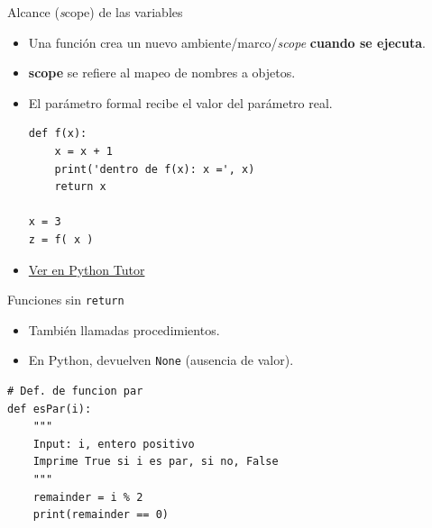 \documentclass[mathserif]{beamer}
\begin{document}
\begin{frame}[fragile]{Alcance (\textit scope) de las variables}
    \begin{itemize}
        \item Una función crea un nuevo ambiente/marco/\textit{scope} {\blue\bfseries cuando se ejecuta}.
        
        \item {\blue\bfseries scope} se refiere al mapeo de nombres a objetos.
        
        \item El {\orange parámetro formal} recibe el valor del {\orange parámetro real}.  
    
\begin{lstlisting}
def f(x):
    x = x + 1
    print('dentro de f(x): x =', x)
    return x

x = 3
z = f( x )
\end{lstlisting}
        
        \item \href{http://www.pythontutor.com/visualize.html#code=def%20f%28x%29%3A%0A%20%20%20%20x%20%3D%20x%20%2B%201%0A%20%20%20%20print%28'in%20f%28x%29%3A%20x%20%3D',%20x%29%0A%20%20%20%20return%20x%0A%0Ax%20%3D%203%0Az%20%3D%20f%28%20x%20%3D%20x%20%29&cumulative=false&curInstr=0&heapPrimitives=nevernest&mode=display&origin=opt-frontend.js&py=3&rawInputLstJSON=%5B%5D&textReferences=false}{Ver en Python Tutor}
    
    \end{itemize}
\end{frame}


\begin{frame}[fragile]{Funciones sin \lstinline|return|}
    \begin{itemize}
        \item También llamadas {\blue procedimientos}. 
        \item En Python, devuelven \lstinline|None| (ausencia de valor).
    \end{itemize}
\begin{lstlisting}
# Def. de funcion par
def esPar(i):
    """ 
    Input: i, entero positivo
    Imprime True si i es par, si no, False
    """
    remainder = i % 2
    print(remainder == 0)
\end{lstlisting}
\end{frame}
\end{document}
